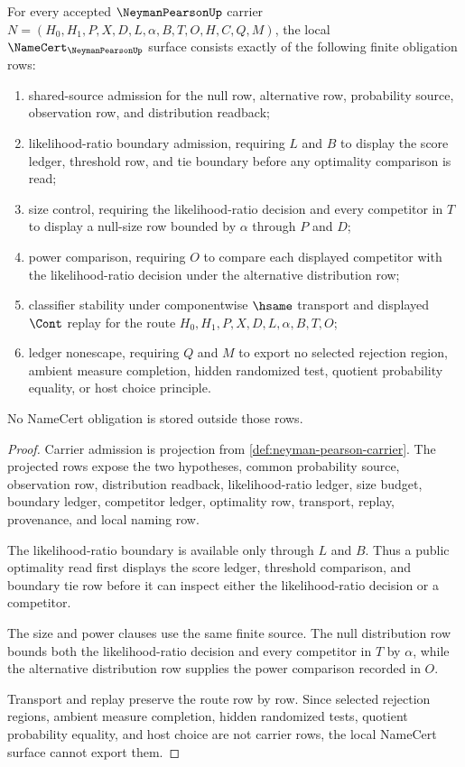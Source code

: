 \begin{theorem}
\label{thm:neyman-pearson-namecert-obligations}
For every accepted $\NeymanPearsonUp$ carrier $N=(H_0,H_1,P,X,D,L,\alpha,B,T,O,H,C,Q,M)$, the local $\NameCert_{\NeymanPearsonUp}$ surface consists exactly of the following finite obligation rows:
\begin{enumerate}
\item shared-source admission for the null row, alternative row, probability source, observation row, and distribution readback;
\item likelihood-ratio boundary admission, requiring $L$ and $B$ to display the score ledger, threshold row, and tie boundary before any optimality comparison is read;
\item size control, requiring the likelihood-ratio decision and every competitor in $T$ to display a null-size row bounded by $\alpha$ through $P$ and $D$;
\item power comparison, requiring $O$ to compare each displayed competitor with the likelihood-ratio decision under the alternative distribution row;
\item classifier stability under componentwise $\hsame$ transport and displayed $\Cont$ replay for the route $H_0,H_1,P,X,D,L,\alpha,B,T,O$;
\item ledger nonescape, requiring $Q$ and $M$ to export no selected rejection region, ambient measure completion, hidden randomized test, quotient probability equality, or host choice principle.
\end{enumerate}
No NameCert obligation is stored outside those rows.
\end{theorem}
\begin{proof}
Carrier admission is projection from \autoref{def:neyman-pearson-carrier}. The projected rows expose the two hypotheses, common probability source, observation row, distribution readback, likelihood-ratio ledger, size budget, boundary ledger, competitor ledger, optimality row, transport, replay, provenance, and local naming row.

The likelihood-ratio boundary is available only through $L$ and $B$. Thus a public optimality read first displays the score ledger, threshold comparison, and boundary tie row before it can inspect either the likelihood-ratio decision or a competitor.

The size and power clauses use the same finite source. The null distribution row bounds both the likelihood-ratio decision and every competitor in $T$ by $\alpha$, while the alternative distribution row supplies the power comparison recorded in $O$.

Transport and replay preserve the route row by row. Since selected rejection regions, ambient measure completion, hidden randomized tests, quotient probability equality, and host choice are not carrier rows, the local NameCert surface cannot export them.
\end{proof}

